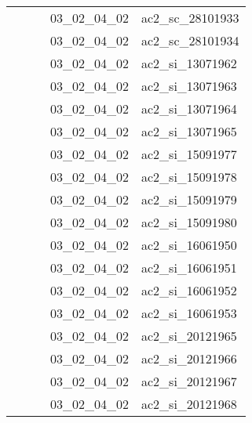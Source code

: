\documentclass[12pt,titlepage]{book}
\begin{document}
\begin{supertabular}{|p{7.5cm}|p{7.5cm}|p{7.5cm}|c|p{10cm}|}
                   &                    &                    & 03\_02\_04\_02 & ac2\_sc\_28101933\\
                   &                    &                    & 03\_02\_04\_02 & ac2\_sc\_28101934\\
                   &                    &                    & 03\_02\_04\_02 & ac2\_si\_13071962\\
                   &                    &                    & 03\_02\_04\_02 & ac2\_si\_13071963\\
                   &                    &                    & 03\_02\_04\_02 & ac2\_si\_13071964\\
                   &                    &                    & 03\_02\_04\_02 & ac2\_si\_13071965\\
                   &                    &                    & 03\_02\_04\_02 & ac2\_si\_15091977\\
                   &                    &                    & 03\_02\_04\_02 & ac2\_si\_15091978\\
                   &                    &                    & 03\_02\_04\_02 & ac2\_si\_15091979\\
                   &                    &                    & 03\_02\_04\_02 & ac2\_si\_15091980\\
                   &                    &                    & 03\_02\_04\_02 & ac2\_si\_16061950\\
                   &                    &                    & 03\_02\_04\_02 & ac2\_si\_16061951\\
                   &                    &                    & 03\_02\_04\_02 & ac2\_si\_16061952\\
                   &                    &                    & 03\_02\_04\_02 & ac2\_si\_16061953\\
                   &                    &                    & 03\_02\_04\_02 & ac2\_si\_20121965\\
                   &                    &                    & 03\_02\_04\_02 & ac2\_si\_20121966\\
                   &                    &                    & 03\_02\_04\_02 & ac2\_si\_20121967\\
                   &                    &                    & 03\_02\_04\_02 & ac2\_si\_20121968\\

\end{supertabular}
\end{document}
